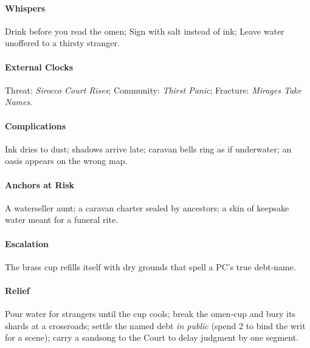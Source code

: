 \paragraph{Whispers} Drink before you read the omen; Sign with salt instead of ink; Leave water unoffered to a thirsty stranger.
\paragraph{External Clocks} Threat: \emph{Sirocco Court Rises}; Community: \emph{Thirst Panic}; Fracture: \emph{Mirages Take Names}.
\paragraph{Complications} Ink dries to dust; shadows arrive late; caravan bells ring as if underwater; an oasis appears on the wrong map.
\paragraph{Anchors at Risk} A waterseller aunt; a caravan charter sealed by ancestors; a skin of keepsake water meant for a funeral rite.
\paragraph{Escalation} The brass cup refills itself with dry grounds that spell a PC’s true debt‑name.
\paragraph{Relief} Pour water for strangers until the cup cools; break the omen‑cup and bury its shards at a crossroads; settle the named debt \emph{in public} (spend 2 \Boons{} to bind the writ for a scene); carry a sandsong to the Court to delay judgment by one segment.
